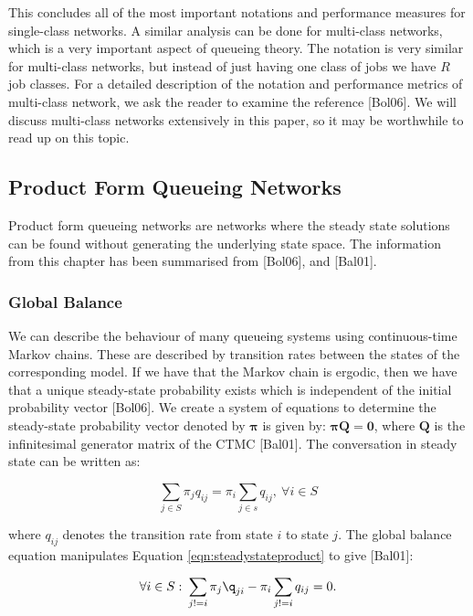 \documentclass[a4paper,11pt,titlepage]{article}
\begin{document}
This concludes all of the most important notations and performance measures for single-class networks. A similar analysis can be done for multi-class networks, which is a very important aspect of queueing theory. The notation is very similar for multi-class networks, but instead of just having one class of jobs we have $R$ job classes. For a detailed description of the notation and performance metrics of multi-class network, we ask the reader to examine the reference [Bol06]. We will discuss multi-class networks extensively in this paper, so it may be worthwhile to read up on this topic. 


\subsection{Product Form Queueing Networks}

Product form queueing networks are networks where the steady state solutions can be found without generating the underlying state space. The information from this chapter has been summarised from [Bol06], and [Bal01].

\subsubsection{Global Balance}

We can describe the behaviour of many queueing systems using continuous-time Markov chains. These are described by transition rates between the states of the corresponding model. If we have that the Markov chain is ergodic, then we have that a unique steady-state probability exists which is independent of the initial probability vector [Bol06]. We create a system of equations to determine the steady-state probability vector denoted by $\boldsymbol{\pi}$ is given by: $\boldsymbol{\pi Q} = \boldsymbol{0}$, where $\mathbf{Q}$ is the infinitesimal generator matrix of the CTMC [Bal01]. The conversation in steady state can be written as: 

\begin{equation}
    \sum_{j \in S} \pi_j q_{ij} = \pi_i \sum_{j \in s} q_{ij}, \: \forall i \in S
    \label{eqn:steadystateproduct}
\end{equation}

where $q_{ij}$ denotes the transition rate from state $i$ to state $j$. The global balance equation manipulates Equation \ref{eqn:steadystateproduct} to give [Bal01]: 

\begin{equation}
    \forall i \in S: \: \sum_{j != i} \pi_j \q_{ji} - \pi_i \sum_{j != i} q_{ij} = 0.
\end{equation}
\end{document}
